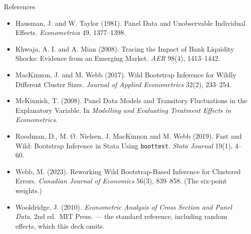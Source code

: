 \documentclass[
  11pt,
  ignorenonframetext,
  aspectratio=169,
]{beamer}
\begin{document}
\begin{frame}[fragile]{References}
\begin{itemize}
  Dependent Variable Models in the Presence of Fixed Effects.
  \emph{Econometrics Journal} 7, 98--119.
\item
  Hausman, J. and W. Taylor (1981). Panel Data and Unobservable
  Individual Effects. \emph{Econometrica} 49, 1377--1398.
\item
  Khwaja, A. I. and A. Mian (2008). Tracing the Impact of Bank Liquidity
  Shocks: Evidence from an Emerging Market. \emph{AER} 98(4),
  1413--1442.
\item
  MacKinnon, J. and M. Webb (2017). Wild Bootstrap Inference for Wildly
  Different Cluster Sizes. \emph{Journal of Applied Econometrics} 32(2),
  233--254.
\item
  McKinnish, T. (2008). Panel Data Models and Transitory Fluctuations in
  the Explanatory Variable. In \emph{Modelling and Evaluating Treatment
  Effects in Econometrics}.
\item
  Roodman, D., M. Ø. Nielsen, J. MacKinnon and M. Webb (2019). Fast and
  Wild: Bootstrap Inference in Stata Using \texttt{boottest}.
  \emph{Stata Journal} 19(1), 4--60.
\item
  Webb, M. (2023). Reworking Wild Bootstrap-Based Inference for
  Clustered Errors. \emph{Canadian Journal of Economics} 56(3),
  839--858. (The six-point weights.)
\item
  Wooldridge, J. (2010). \emph{Econometric Analysis of Cross Section and
  Panel Data}, 2nd ed.~MIT Press. --- the standard reference, including
  random effects, which this deck omits.
\end{itemize}
\end{frame}
\end{document}
